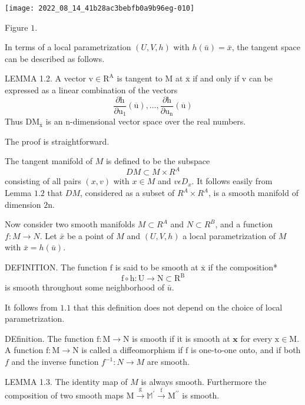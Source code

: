 \documentclass[10pt]{article}
\begin{document}
\texttt{[image: 2022\_08\_14\_41b28ac3bebfb0a9b96eg-010]}

Figure $1 .$

In terms of a local parametrization $(U, V, h)$ with $h(\bar{u})=\bar{x}$, the tangent space can be described as follows.

LEMMA 1.2. A vector $\mathrm{v} \in \mathrm{R}^{\mathrm{A}}$ is tangent to $\mathrm{M}$ at $\overline{\mathrm{x}}$ if and only if $\mathrm{v}$ can be expressed as a linear combination of the vectors
$$
\frac{\partial \mathrm{h}}{\partial \mathrm{u}_{1}}(\overline{\mathrm{u}}), \ldots, \frac{\partial \mathrm{h}}{\partial \mathrm{u}_{\mathrm{n}}}(\overline{\mathrm{u}})
$$
Thus $\mathrm{DM}_{\overline{\mathrm{x}}}$ is an $\mathrm{n}$-dimensional vector space over the real numbers.

The proof is straightforward.

The tangent manifold of $M$ is defined to be the subspace
$$
D M \subset M \times R^{A}
$$
consisting of all pairs $(x, v)$ with $x \in M$ and $v \epsilon D_{x}$. It follows easily from Lemma $1.2$ that $D M$, considered as a subset of $R^{A} \times R^{A}$, is a smooth manifold of dimension $2 \mathrm{n}$.

Now consider two smooth manifolds $M \subset R^{A}$ and $N \subset R^{B}$, and a function $f: M \rightarrow N$. Let $\bar{x}$ be a point of $M$ and $(U, V, h)$ a local parametrization of $M$ with $\bar{x}=h(\bar{u})$.

DEFINITION. The function $\mathrm{f}$ is said to be smooth at $\overline{\mathrm{x}}$ if the composition*
$$
\mathrm{f} \circ \mathrm{h}: \mathrm{U} \rightarrow \mathrm{N} \subset \mathrm{R}^{\mathrm{B}}
$$
is smooth throughout some neighborhood of $\bar{u}$.

It follows from $1.1$ that this definition does not depend on the choice of local parametrization.

DEfinition. The function $\mathrm{f}: \mathrm{M} \rightarrow \mathrm{N}$ is smooth if it is smooth at $\mathbf{x}$ for every $\mathrm{x} \in \mathrm{M}$. A function $\mathrm{f}: \mathrm{M} \rightarrow \mathrm{N}$ is called a diffeomorphism if $\mathrm{f}$ is one-to-one onto, and if both $f$ and the inverse function $f^{-1}: N \rightarrow M$ are smooth.

LEMMA 1.3. The identity map of $M$ is always smooth. Furthermore the composition of two smooth maps $\mathrm{M} \stackrel{\mathrm{g}}{\rightarrow} \mathbb{M}^{\prime} \stackrel{\mathrm{f}}{\rightarrow} \mathrm{M}^{\prime \prime}$ is smooth.
\end{document}

